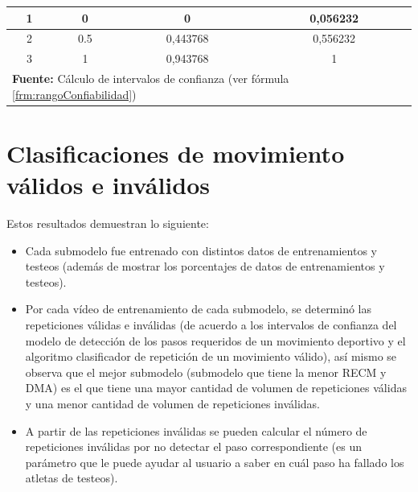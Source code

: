 \begin{table}[H]
\begin{center}
\begin{tabular}{cccc}
\multicolumn{1}{|c|}{1} & \multicolumn{1}{c|}{0} & \multicolumn{1}{c|}{0} & \multicolumn{1}{c|}{0,056232} \\ \hline
\multicolumn{1}{|c|}{2} & \multicolumn{1}{c|}{0.5} & \multicolumn{1}{c|}{0,443768} & \multicolumn{1}{c|}{0,556232} \\ \hline
\multicolumn{1}{|c|}{3} & \multicolumn{1}{c|}{1} & \multicolumn{1}{c|}{0,943768} & \multicolumn{1}{c|}{1} \\ \hline
\multicolumn{4}{l}{\textbf{Fuente:} C\'alculo de intervalos de confianza (ver f\'ormula \ref{frm:rangoConfiabilidad})}
\end{tabular}
\end{center}
\end{table}
\section{Clasificaciones de movimiento v\'alidos e inv\'alidos} \label{res:clasiMov}
Estos resultados demuestran lo siguiente:
\begin{itemize}
\item  Cada submodelo fue entrenado con distintos datos de entrenamientos y testeos (adem\'as de mostrar los porcentajes de datos de entrenamientos y testeos).
\item Por cada v\'ideo de entrenamiento de cada submodelo, se determin\'o  las repeticiones v\'alidas e inv\'alidas (de acuerdo a los intervalos de confianza del modelo de detecci\'on de los pasos requeridos de un movimiento deportivo  y el algoritmo clasificador de repetici\'on de un movimiento v\'alido), as\'i mismo se observa que el mejor submodelo (submodelo que tiene la menor RECM y DMA) es el que tiene una mayor cantidad de volumen de repeticiones v\'alidas y una menor cantidad de volumen de repeticiones inv\'alidas.
\item A partir de las repeticiones inv\'alidas se pueden calcular el n\'umero de repeticiones inv\'alidas por no detectar el paso correspondiente (es un par\'ametro que le puede ayudar al usuario a saber en cu\'al paso ha fallado los atletas de testeos). 
\end{itemize}
